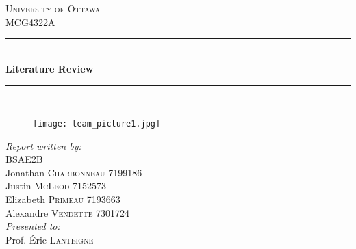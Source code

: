 \documentclass[12pt,twoside]{article}
\begin{document}
	
	\begin{titlepage}
		
		\newcommand{\HRule}{\rule{\linewidth}{0.5mm}} %
		
		\begin{center} %
			
			
			\textsc{\LARGE University of Ottawa}\\[1.0cm] %
			\textsc{\Large MCG4322A}\\[0.5cm] %
			
			
			\HRule \\[0.4cm]
			{ \huge \bfseries Literature Review}\\[0.4cm] %
			\HRule \\[0.5cm]
			
			\begin{figure}[H]
				\centering
				\texttt{[image: team\_picture1.jpg]} %
			\end{figure}
			
			
			\emph{Report written by:}\\[0.5cm]
			BSAE2B\\
			Jonathan \textsc{Charbonneau} 7199186\\
			Justin \textsc{McLeod} 7152573\\
			Elizabeth \textsc{Primeau} 7193663\\
			Alexandre \textsc{Vendette} 7301724\\[1cm]
			\emph{Presented to:}\\[0.5cm]
			Prof. Éric \textsc{Lanteigne}\\[1.5cm]
			

\end{center}
\end{titlepage}
\end{document}

